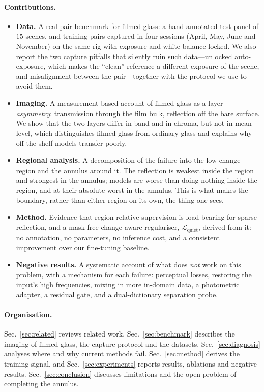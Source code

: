 \paragraph{Contributions.}
\begin{itemize}
\item \textbf{Data.} A real-pair benchmark for filmed glass: a hand-annotated test panel of
$15$ scenes, and training pairs captured in four sessions (April, May, June and November) on the
same rig with exposure and white balance locked. We also report the two capture pitfalls that
silently ruin such data---unlocked auto-exposure, which makes the ``clean'' reference a different
exposure of the scene, and misalignment between the pair---together with the protocol we use to
avoid them.
\item \textbf{Imaging.} A measurement-based account of filmed glass as a layer \emph{asymmetry}:
transmission through the film bulk, reflection off the bare surface. We show that the two layers
differ in band and in chroma, but not in mean level, which distinguishes filmed glass from ordinary
glass and explains why off-the-shelf models transfer poorly.
\item \textbf{Regional analysis.} A decomposition of the failure into the low-change region and the
annulus around it. The reflection is weakest inside the region and strongest in the annulus; models
are worse than doing nothing inside the region, and at their absolute worst in the annulus. This is
what makes the boundary, rather than either region on its own, the thing one sees.
\item \textbf{Method.} Evidence that region-relative supervision is load-bearing for sparse
reflection, and a mask-free change-aware regulariser, $\mathcal{L}_{\mathrm{quiet}}$, derived from
it: no annotation, no parameters, no inference cost, and a consistent improvement over our
fine-tuning baseline.
\item \textbf{Negative results.} A systematic account of what does \emph{not} work on this problem,
with a mechanism for each failure: perceptual losses, restoring the input's high frequencies,
mixing in more in-domain data, a photometric adapter, a residual gate, and a dual-dictionary
separation probe.
\end{itemize}

\paragraph{Organisation.}
Sec.~\ref{sec:related} reviews related work. Sec.~\ref{sec:benchmark} describes the imaging of
filmed glass, the capture protocol and the datasets. Sec.~\ref{sec:diagnosis} analyses where and why
current methods fail. Sec.~\ref{sec:method} derives the training signal, and
Sec.~\ref{sec:experiments} reports results, ablations and negative results.
Sec.~\ref{sec:conclusion} discusses limitations and the open problem of completing the annulus.
